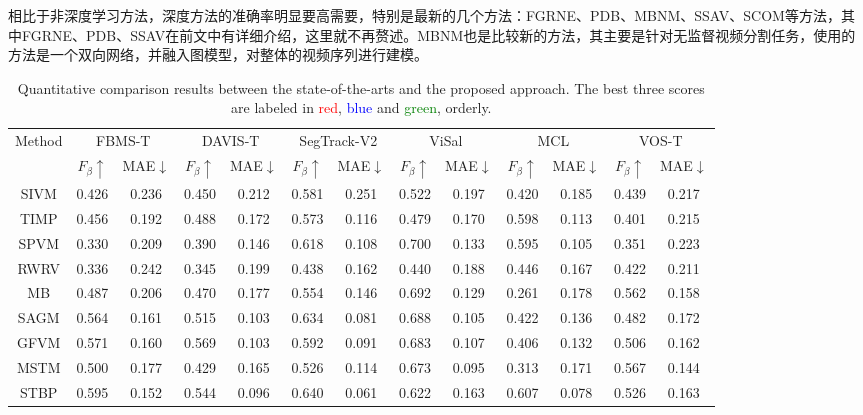 相比于非深度学习方法，深度方法的准确率明显要高需要，特别是最新的几个方法：FGRNE、PDB、MBNM、SSAV、SCOM等方法，其中FGRNE、PDB、SSAV在前文中有详细介绍，这里就不再赘述。MBNM也是比较新的方法，其主要是针对无监督视频分割任务，使用的方法是一个双向网络，并融入图模型，对整体的视频序列进行建模。
\begin{table}[]
\label{compare_all}
\scriptsize
\center
\caption{Quantitative comparison results between the state-of-the-arts and the proposed approach. The best three scores are labeled in \textcolor{red}{red}, \textcolor{blue}{blue} and \textcolor{green}{green}, orderly.}
\begin{tabular}{|c|c|c|c|c|c|c|c|c|c|c|c|c|}
\hline
\multirow{2}{*}{Method} & \multicolumn{2}{c|}{FBMS-T} & \multicolumn{2}{c|}{DAVIS-T} & \multicolumn{2}{c|}{SegTrack-V2} & \multicolumn{2}{c|}{ViSal} & \multicolumn{2}{c|}{MCL} & \multicolumn{2}{c|}{VOS-T} \\ \cline{2-13}
 & $F_\beta\uparrow$ & MAE$\downarrow$ & $F_\beta\uparrow$ & MAE$\downarrow$ & $F_\beta\uparrow$ & MAE$\downarrow$ & $F_\beta\uparrow$ & MAE$\downarrow$ & $F_\beta\uparrow$ & MAE$\downarrow$ & $F_\beta\uparrow$ & MAE$\downarrow$ \\ \hline
SIVM & 0.426 & 0.236 & 0.450 & 0.212 & 0.581 & 0.251 & 0.522 & 0.197 & 0.420 & 0.185 & 0.439 & 0.217 \\ \hline
TIMP & 0.456 & 0.192 & 0.488 & 0.172 & 0.573 & 0.116 & 0.479 & 0.170 & 0.598 & 0.113 & 0.401 & 0.215 \\ \hline
SPVM & 0.330 & 0.209 & 0.390 & 0.146 & 0.618 & 0.108 & 0.700 & 0.133 & 0.595 & 0.105 & 0.351 & 0.223 \\ \hline
RWRV & 0.336 & 0.242 & 0.345 & 0.199 & 0.438 & 0.162 & 0.440 & 0.188 & 0.446 & 0.167 & 0.422 & 0.211 \\ \hline
MB & 0.487 & 0.206 & 0.470 & 0.177 & 0.554 & 0.146 & 0.692 & 0.129 & 0.261 & 0.178 & 0.562 & 0.158 \\ \hline
SAGM & 0.564 & 0.161 & 0.515 & 0.103 & 0.634 & 0.081 & 0.688 & 0.105 & 0.422 & 0.136 & 0.482 & 0.172 \\ \hline
GFVM & 0.571 & 0.160 & 0.569 & 0.103 & 0.592 & 0.091 & 0.683 & 0.107 & 0.406 & 0.132 & 0.506 & 0.162 \\ \hline
MSTM & 0.500 & 0.177 & 0.429 & 0.165 & 0.526 & 0.114 & 0.673 & 0.095 & 0.313 & 0.171 & 0.567 & 0.144 \\ \hline
STBP & 0.595 & 0.152 & 0.544 & 0.096 & 0.640 & 0.061 & 0.622 & 0.163 & 0.607 & 0.078 & 0.526 & 0.163 \\ \hline

\end{tabular}
\end{table}
